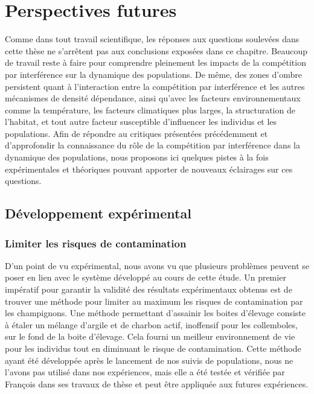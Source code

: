 \section{Perspectives futures}

Comme dans tout travail scientifique, les réponses aux questions soulevées dans
cette thèse ne s'arrêtent pas aux conclusions exposées dans ce chapitre.
Beaucoup de travail reste à faire pour comprendre pleinement les impacts de la
compétition par interférence sur la dynamique des populations. De même, des
zones d'ombre persistent quant à l'interaction entre la compétition par
interférence et les autres mécanismes de densité dépendance, ainsi qu'avec les
facteurs environnementaux comme la température, les facteurs climatiques plus
larges, la structuration de l'habitat, et tout autre facteur susceptible
d'influencer les individus et les populations. Afin de répondre au critiques
présentées précédemment et d'approfondir la connaissance du rôle de la
compétition par interférence dans la dynamique des populations, nous proposons
ici quelques pistes à la fois expérimentales et théoriques pouvant apporter de
nouveaux éclairages sur ces questions.

\subsection{Développement expérimental}

\subsubsection{Limiter les risques de contamination}

D'un point de vu expérimental, nous avons vu que plusieurs problèmes peuvent se
poser en lien avec le système développé au cours de cette étude. Un premier
impératif pour garantir la validité des résultats expérimentaux obtenus est de
trouver une méthode pour limiter au maximum les risques de contamination par les
champignons. Une méthode permettant d'assainir les boites d'élevage consiste à
étaler un mélange d'argile et de charbon actif, inoffensif pour les collemboles,
sur le fond de la boite d'élevage. Cela fourni un meilleur environnement de vie
pour les individus tout en diminuant le risque de contamination. Cette méthode
ayant été développée après le lancement de nos suivis de populations, nous ne
l'avons pas utilisé dans nos expériences, mais elle a été testée et vérifiée par
François \textcites{mallard2013b} dans ses travaux de thèse et peut être
appliquée aux futures expériences.

